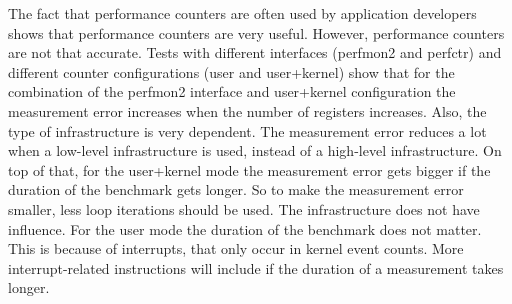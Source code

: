 The fact that performance counters are often used by application developers shows that performance counters are very useful. However, performance counters are not that accurate. Tests with different interfaces (perfmon2 and perfctr) and different counter configurations (user and user+kernel) show that for the combination of the perfmon2 interface and user+kernel configuration the measurement error increases when the number of registers increases. \cite{AccuracyPerformanceCounter}
Also, the type of infrastructure is very dependent. The measurement error reduces a lot when a low-level infrastructure is used, instead of a high-level infrastructure.
On top of that, for the user+kernel mode the measurement error gets bigger if the duration of the benchmark gets longer. \cite{AccuracyPerformanceCounter} So to make the measurement error smaller, less loop iterations should be used.  The infrastructure does not have influence. For the user mode the duration of the benchmark does not matter. This is because of interrupts, that only occur in kernel event counts. More interrupt-related instructions will include if the duration of a measurement takes longer.
